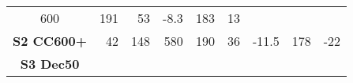 \begin{longtable}[]{@{}crrrrrrrr@{}}
\begin{minipage}[t]{0.06\columnwidth}
600\strut
\end{minipage} & \begin{minipage}[t]{0.07\columnwidth}\raggedleft\strut
191\strut
\end{minipage} & \begin{minipage}[t]{0.07\columnwidth}\raggedleft\strut
53\strut
\end{minipage} & \begin{minipage}[t]{0.04\columnwidth}\raggedleft\strut
-8.3\strut
\end{minipage} & \begin{minipage}[t]{0.13\columnwidth}\raggedleft\strut
183\strut
\end{minipage} & \begin{minipage}[t]{0.13\columnwidth}\raggedleft\strut
13\strut
\end{minipage}\tabularnewline
\begin{minipage}[t]{0.10\columnwidth}\centering\strut
\textbf{S2 CC600+}\strut
\end{minipage} & \begin{minipage}[t]{0.09\columnwidth}\raggedleft\strut
42\strut
\end{minipage} & \begin{minipage}[t]{0.06\columnwidth}\raggedleft\strut
148\strut
\end{minipage} & \begin{minipage}[t]{0.06\columnwidth}\raggedleft\strut
580\strut
\end{minipage} & \begin{minipage}[t]{0.07\columnwidth}\raggedleft\strut
190\strut
\end{minipage} & \begin{minipage}[t]{0.07\columnwidth}\raggedleft\strut
36\strut
\end{minipage} & \begin{minipage}[t]{0.04\columnwidth}\raggedleft\strut
-11.5\strut
\end{minipage} & \begin{minipage}[t]{0.13\columnwidth}\raggedleft\strut
178\strut
\end{minipage} & \begin{minipage}[t]{0.13\columnwidth}\raggedleft\strut
-22\strut
\end{minipage}\tabularnewline
\begin{minipage}[t]{0.10\columnwidth}\centering\strut
\textbf{S3 Dec50}\strut
\end{minipage} & \begin{minipage}[t]{0.09\columnwidth}\raggedleft\strut

\end{minipage}
\end{longtable}
